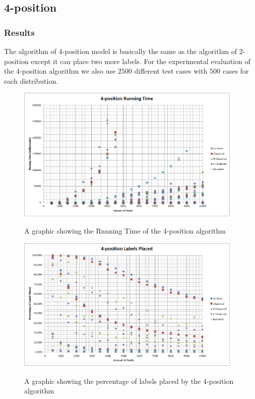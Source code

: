 \documentclass[crop=false,a4paper,oneside,11pt]{standalone}
\begin{document}
\subsection{4-position}
\subsubsection{Results}
The algorithm of 4-position model is basically the same as the algorithm of 2-position except it can place two more labels. For the experimental evaluation of the 4-position algorithm we also use $2500$ different test cases with $500$ cases for each distribution. 

 \begin{figure}[h!]
 \centering
 \centerline{\includegraphics[scale = 0.6]{4PosRunningTime.png}}
 \caption{A graphic showing the Running Time of the 4-position algorithm}
 \end{figure}

 \begin{figure}[h!]
 \centering
  \centerline{\includegraphics[scale = 0.6]{4PosLabelsPlaced.png}}
  \caption{A graphic showing the percentage of labels placed by the 4-position algorithm}
 \end{figure}
\end{document}

